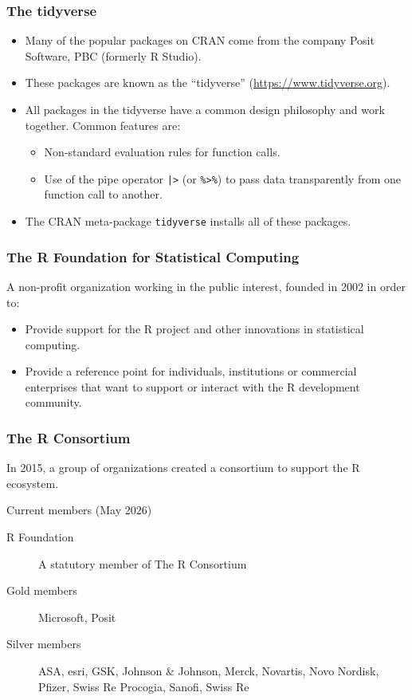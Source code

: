 \documentclass[svgnames, aspectratio=169]{beamer}
\begin{document}
\begin{frame}[fragile]
  \frametitle{The tidyverse}
  
  \begin{itemize}
  \item Many of the popular packages on CRAN come from the company
    Posit Software, PBC (formerly R Studio).
  \item These packages are known as the ``tidyverse''
    (\url{https://www.tidyverse.org}).
  \item All packages in the tidyverse have a common design philosophy
    and work together. Common features are:
    \begin{itemize}
    \item Non-standard evaluation rules for function calls.
    \item Use of the pipe operator \verb+|>+ (or \verb+%>%+) to pass
      data transparently from one function call to another.
    \end{itemize}
  \item The CRAN meta-package \texttt{tidyverse} installs all of these
    packages.
  \end{itemize}
  
\end{frame}

\begin{frame}
  \frametitle{The R Foundation for Statistical Computing}

  A non-profit organization working in the public interest, founded
  in 2002 in order to:
  \begin{itemize}
  \item Provide support for the R project and other innovations in
    statistical computing.
  \item Provide a reference point for individuals, institutions or
    commercial enterprises that want to support or interact with the R
    development community.
  \end{itemize}
  
\end{frame}
    
\begin{frame}
  \frametitle{The R Consortium}

  In 2015, a group of organizations created a consortium to support
  the R ecosystem.

  Current members (May 2026)
  \begin{description}
  \item[R Foundation] A statutory member of The R Consortium
  \item[Gold members] Microsoft, Posit
  \item[Silver members] ASA, esri, GSK, Johnson \& Johnson, Merck, Novartis, Novo Nordisk, Pfizer, Swiss Re
    Procogia, Sanofi, Swiss Re
  \end{description}
  
\end{frame}
\end{document}
